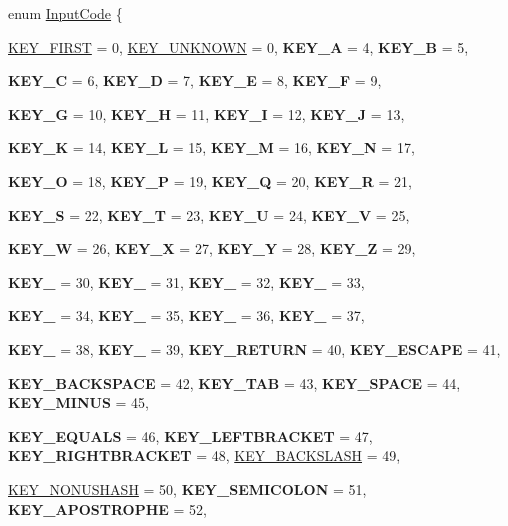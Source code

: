 \begin{DoxyCompactItemize}
enum \hyperlink{classMezzanine_1_1MetaCode_a3b5633f0145bf3287cf53a3f05b5563c}{InputCode} \{ \par
\hyperlink{classMezzanine_1_1MetaCode_a3b5633f0145bf3287cf53a3f05b5563ca1ccda5063e3d1e72a9eacd70b030342e}{KEY\_\-FIRST} =  0, 
\hyperlink{classMezzanine_1_1MetaCode_a3b5633f0145bf3287cf53a3f05b5563ca9c3714a0de55dca42c122e5cbced974f}{KEY\_\-UNKNOWN} =  0, 
{\bfseries KEY\_\-A} =  4, 
{\bfseries KEY\_\-B} =  5, 
\par
{\bfseries KEY\_\-C} =  6, 
{\bfseries KEY\_\-D} =  7, 
{\bfseries KEY\_\-E} =  8, 
{\bfseries KEY\_\-F} =  9, 
\par
{\bfseries KEY\_\-G} =  10, 
{\bfseries KEY\_\-H} =  11, 
{\bfseries KEY\_\-I} =  12, 
{\bfseries KEY\_\-J} =  13, 
\par
{\bfseries KEY\_\-K} =  14, 
{\bfseries KEY\_\-L} =  15, 
{\bfseries KEY\_\-M} =  16, 
{\bfseries KEY\_\-N} =  17, 
\par
{\bfseries KEY\_\-O} =  18, 
{\bfseries KEY\_\-P} =  19, 
{\bfseries KEY\_\-Q} =  20, 
{\bfseries KEY\_\-R} =  21, 
\par
{\bfseries KEY\_\-S} =  22, 
{\bfseries KEY\_\-T} =  23, 
{\bfseries KEY\_\-U} =  24, 
{\bfseries KEY\_\-V} =  25, 
\par
{\bfseries KEY\_\-W} =  26, 
{\bfseries KEY\_\-X} =  27, 
{\bfseries KEY\_\-Y} =  28, 
{\bfseries KEY\_\-Z} =  29, 
\par
{\bfseries KEY\_} =  30, 
{\bfseries KEY\_} =  31, 
{\bfseries KEY\_} =  32, 
{\bfseries KEY\_} =  33, 
\par
{\bfseries KEY\_} =  34, 
{\bfseries KEY\_} =  35, 
{\bfseries KEY\_} =  36, 
{\bfseries KEY\_} =  37, 
\par
{\bfseries KEY\_} =  38, 
{\bfseries KEY\_} =  39, 
{\bfseries KEY\_\-RETURN} =  40, 
{\bfseries KEY\_\-ESCAPE} =  41, 
\par
{\bfseries KEY\_\-BACKSPACE} =  42, 
{\bfseries KEY\_\-TAB} =  43, 
{\bfseries KEY\_\-SPACE} =  44, 
{\bfseries KEY\_\-MINUS} =  45, 
\par
{\bfseries KEY\_\-EQUALS} =  46, 
{\bfseries KEY\_\-LEFTBRACKET} =  47, 
{\bfseries KEY\_\-RIGHTBRACKET} =  48, 
\hyperlink{classMezzanine_1_1MetaCode_a3b5633f0145bf3287cf53a3f05b5563caf280c1704fc6955d872b8ff7f91693c4}{KEY\_\-BACKSLASH} =  49, 
\par
\hyperlink{classMezzanine_1_1MetaCode_a3b5633f0145bf3287cf53a3f05b5563cad905793c1a50f81dc4d779df8eba2964}{KEY\_\-NONUSHASH} =  50, 
{\bfseries KEY\_\-SEMICOLON} =  51, 
{\bfseries KEY\_\-APOSTROPHE} =  52, 

\end{DoxyCompactItemize}
